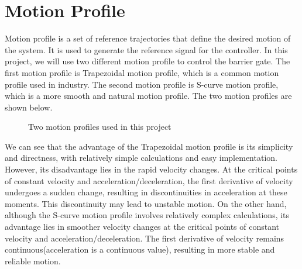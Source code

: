 \documentclass[11pt,a4paper]{article}%
\begin{document}
\section{Motion Profile}
Motion profile is a set of reference trajectories that define the desired motion of the system. It is used to generate
the reference signal for the controller. In this project, we will use two different motion profile to control the barrier gate.
The first motion profile is Trapezoidal motion profile, which is a common motion profile used in industry. The second motion
profile is S-curve motion profile, which is a more smooth and natural motion profile. The two motion profiles are shown below.
\begin{figure}[H]
    \centering
    \caption{Two motion profiles used in this project} 
\end{figure}
We can see that the advantage of the Trapezoidal motion profile is its simplicity and directness, with relatively simple calculations and easy implementation. However, its disadvantage lies in the rapid velocity changes. At the critical points of constant velocity and acceleration/deceleration, the first derivative of velocity undergoes a sudden change, resulting in discontinuities in acceleration at these moments. This discontinuity may lead to unstable motion. On the other hand, although the S-curve motion profile involves relatively complex calculations, its advantage lies in smoother velocity changes at the critical points of constant velocity and acceleration/deceleration. The first derivative of velocity remains continuous(acceleration is a continuous value), resulting in more stable and reliable motion.
\end{document}
